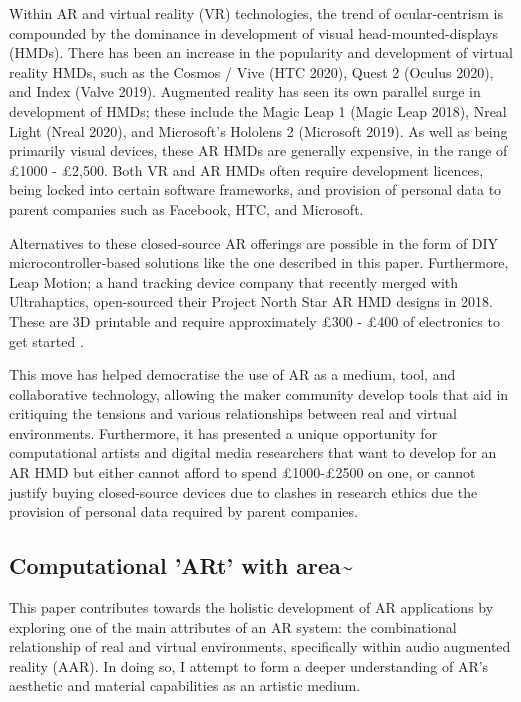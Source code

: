 Within AR and virtual reality (VR) technologies, the trend of ocular-centrism is compounded by the dominance in development of visual head-mounted-displays (HMDs). There has been an increase in the popularity and development of virtual reality HMDs, such as the Cosmos / Vive (HTC 2020), Quest 2 (Oculus 2020), and Index (Valve 2019). Augmented reality has seen its own parallel surge in development of HMDs; these include the Magic Leap 1 (Magic Leap 2018), Nreal Light (Nreal 2020), and Microsoft’s Hololens 2 (Microsoft 2019). As well as being primarily visual devices, these AR HMDs are generally expensive, in the range of £1000 - £2,500. Both VR and AR HMDs often require development licences, being locked into certain software frameworks, and provision of personal data to parent companies such as Facebook, HTC, and Microsoft.

Alternatives to these closed-source AR offerings are possible in the form of DIY microcontroller-based solutions like the one described in this paper. Furthermore, Leap Motion; a hand tracking device company that recently merged with Ultrahaptics, open-sourced their Project North Star AR HMD designs in 2018. These are 3D printable and require approximately £300 - £400 of electronics to get started \citep{leapmotion2018}.

This move has helped democratise the use of AR as a medium, tool, and collaborative technology, allowing the maker community develop tools \citep{rompapas2020} that aid in critiquing the tensions and various relationships between real and virtual environments. Furthermore, it has presented a unique opportunity for computational artists and digital media researchers that want to develop for an AR HMD but either cannot afford to spend £1000-£2500 on one, or cannot justify buying closed-source devices due to clashes in research ethics due the provision of personal data required by parent companies.

\subsection{Computational 'ARt' with area\textasciitilde{}} \label{sec: area-intro-area}
This paper contributes towards the holistic development of AR applications by exploring one of the main attributes of an AR system: the combinational relationship of real and virtual environments, specifically within audio augmented reality (AAR). In doing so, I attempt to form a deeper understanding of AR's aesthetic and material capabilities as an artistic medium.

